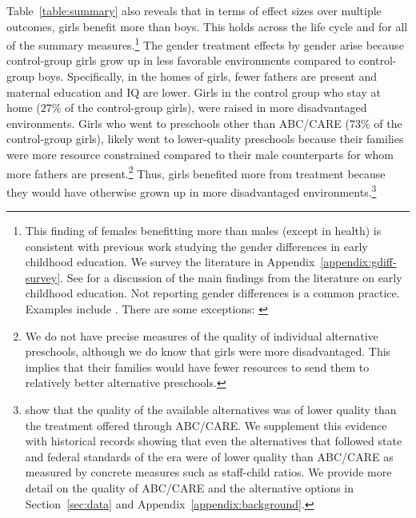Table~\ref{table:summary} also reveals that in terms of effect sizes over multiple outcomes, girls benefit more than boys. This holds across the life cycle and for all of the summary measures.\footnote{This finding of females benefitting more than males (except in health) is consistent with previous work studying the gender differences in early childhood education. We survey the literature in Appendix~\ref{appendix:gdiff-survey}. See \citet{Elango_Hojman_etal_2016_Early-Edu} for a discussion of the main findings from the literature on early childhood education. Not reporting gender differences is a common practice. Examples include \citet{Bernal_Keane_2011_JoLE,Cascio_Schanzenbach_2013_ImpactsExpandingAccess,Bitler_et_al_2014_Head_Start_Unpublished,Kline_Walters_2016_QJE}. There are some exceptions: \citet{Anderson_2008_JASA,Heckman_Moon_etal_2010_QE,Campbell_Conti_etal_2014_EarlyChildhoodInvestments,Garcia_Heckman_Leaf_etal_2017_Comp_CBA_Unpublished}} The gender treatment effects by gender arise because control-group girls grow up in less favorable environments compared to control-group boys. Specifically, in the homes of girls, fewer fathers are present and maternal education and IQ are lower. Girls in the control group who stay at home ($27\%$ of the control-group girls), were raised in more disadvantaged environments. Girls who went to preschools other than ABC/CARE ($73\%$ of the control-group girls), likely went to lower-quality preschools because their families were more resource constrained compared to their male counterparts for whom more fathers are present.\footnote{We do not have precise measures of the quality of individual alternative preschools, although we do know that girls were more disadvantaged. This implies that their families would have fewer resources to send them to relatively better alternative preschools.} Thus, girls benefited more from treatment because they would have otherwise grown up in more disadvantaged environments.\footnote{\citet{Burchinal_etal_1989_CD_Daycare-Pre-K-Dev} show that the quality of the available alternatives was of lower quality than the treatment offered through ABC/CARE. We supplement this evidence with historical records showing that even the alternatives that followed state and federal standards of the era were of lower quality than ABC/CARE as measured by concrete measures such as staff-child ratios. We provide more detail on the quality of ABC/CARE and the alternative options in Section~\ref{sec:data} and Appendix~\ref{appendix:background}.}


